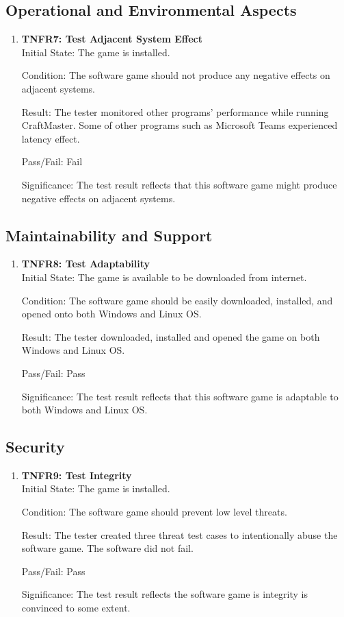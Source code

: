 \documentclass[12pt, titlepage]{article}
\begin{document}
\subsection{Operational and Environmental Aspects}
\begin{enumerate}
\item{\textbf{TNFR7: Test Adjacent System Effect\\}}\label{adjacent}
Initial State: The game is installed.

Condition: The software game should not produce any negative effects on adjacent systems.

Result: The tester monitored other programs' performance while running CraftMaster. Some of other programs such as Microsoft Teams experienced latency effect.

Pass/Fail: Fail

Significance: The test result reflects that this software game might produce negative effects on adjacent systems.
\end{enumerate}

\subsection{Maintainability and Support}
\begin{enumerate}
\item{\textbf{TNFR8: Test Adaptability\\}}
Initial State: The game is available to be downloaded from internet.

Condition: The software game should be easily downloaded, installed, and opened onto both Windows and Linux OS.

Result: The tester downloaded, installed and opened the game on both Windows and Linux OS.

Pass/Fail: Pass

Significance: The test result reflects that this software game is adaptable to both Windows and Linux OS.

\end{enumerate}

\subsection{Security}
\begin{enumerate}
\item{\textbf{TNFR9: Test Integrity\\}}
Initial State: The game is installed.

Condition: The software game should prevent low level threats.

Result: The tester created three threat test cases to intentionally abuse the software game. The software did not fail.

Pass/Fail: Pass

Significance: The test result reflects the software game is integrity is convinced to some extent.
\end{enumerate}
\end{document}
